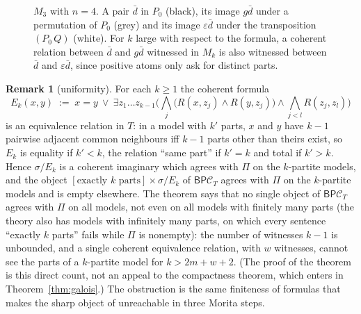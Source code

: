 \documentclass[11pt]{amsart}
\theoremstyle{definition}
\newtheorem{rem}[thm]{Remark}
\newcommand{\PP}{\mathsf P}
\newcommand{\BB}{\mathsf B}
\newcommand{\cC}{\mathcal C}
\begin{document}
\begin{figure}[ht]
\centering
{}
\caption{$M_3$ with $n=4$. A pair $\bar d$ in $P_0$ (black), its image $g\bar d$ under a permutation of $P_0$ (grey) and its image $\varepsilon\bar d$ under the transposition $(P_0\,Q)$ (white). For $k$ large with respect to the formula, a coherent relation between $\bar d$ and $g\bar d$ witnessed in $M_k$ is also witnessed between $\bar d$ and $\varepsilon\bar d$, since positive atoms only ask for distinct parts.}
\end{figure}

\begin{rem}[uniformity]\label{rem:compact}
For each $k\ge1$ the coherent formula
\[
E_k(x,y)\;:=\;x=y\ \vee\ \exists z_1\dots z_{k-1}\Big(\bigwedge_{j}
\big(R(x,z_j)\wedge R(y,z_j)\big)\wedge\bigwedge_{j<l}R(z_j,z_l)\Big)
\]
is an equivalence relation in $T$: in a model with $k'$ parts, $x$ and
$y$ have $k-1$ pairwise adjacent common neighbours iff $k-1$ parts other
than theirs exist, so $E_k$ is equality if $k'<k$, the relation ``same
part'' if $k'=k$ and total if $k'>k$. Hence $\sigma/E_k$ is a coherent
imaginary which agrees with $\Pi$ on the $k$-partite models, and the
object $[\text{exactly $k$ parts}]\times\sigma/E_k$ of $\BB\PP\cC_T$
agrees with $\Pi$ on the $k$-partite models and is empty elsewhere.
The theorem says that no single object of $\BB\PP\cC_T$ agrees with
$\Pi$ on all models, not even on all models with finitely many parts
(the theory also has models with infinitely many parts, on which every
sentence ``exactly $k$ parts'' fails while $\Pi$ is nonempty): the
number of witnesses $k-1$ is unbounded, and a single coherent
equivalence relation, with $w$ witnesses, cannot see the parts of a
$k$-partite model for $k>2m+w+2$. (The proof of the theorem is this
direct count, not an appeal to the compactness theorem, which enters in
Theorem~\ref{thm:galois}.) The obstruction is the same finiteness of
formulas that makes the sharp object of \cite[Thm.~5.6]{TheoryComp}
unreachable in three Morita steps.
\end{rem}
\end{document}
